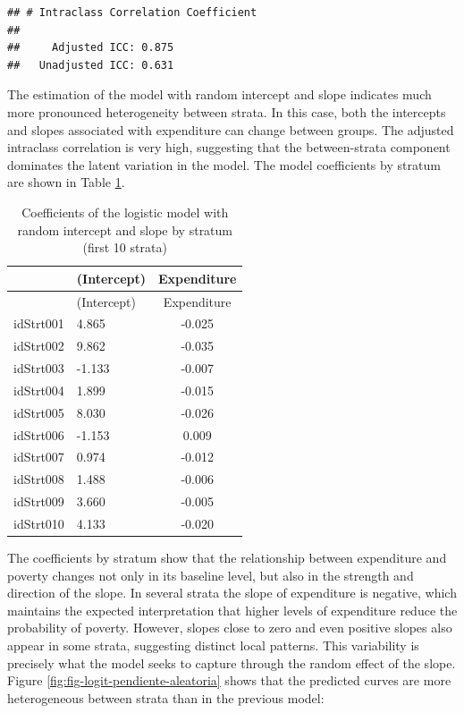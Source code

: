 \documentclass[
  english,
  12pt,
]{book}
\newenvironment{Shaded}{\begin{snugshade}}{\end{snugshade}}
\newcommand{\DataTypeTok}[1]{\textcolor[rgb]{0.13,0.29,0.53}{#1}}
\newcommand{\DecValTok}[1]{\textcolor[rgb]{0.00,0.00,0.81}{#1}}
\newcommand{\FunctionTok}[1]{\textcolor[rgb]{0.13,0.29,0.53}{\textbf{#1}}}
\newcommand{\NormalTok}[1]{#1}
\newcommand{\SpecialCharTok}[1]{\textcolor[rgb]{0.81,0.36,0.00}{\textbf{#1}}}
\begin{document}
\begin{verbatim}
## # Intraclass Correlation Coefficient
## 
##     Adjusted ICC: 0.875
##   Unadjusted ICC: 0.631
\end{verbatim}

The estimation of the model with random intercept and slope indicates much more pronounced heterogeneity between strata. In this case, both the intercepts and slopes associated with expenditure can change between groups. The adjusted intraclass correlation is very high, suggesting that the between-strata component dominates the latent variation in the model. The model coefficients by stratum are shown in Table \ref{tab:tab-coef-logit-pendiente}.

\begin{Shaded}
\end{Shaded}

\begin{longtable}[]{@{}llc@{}}
\caption{\label{tab:tab-coef-logit-pendiente}Coefficients of the logistic model with random intercept and slope by stratum (first 10 strata)}\tabularnewline
\toprule\noalign{}
& (Intercept) & Expenditure \\
\midrule\noalign{}
\endfirsthead
\toprule\noalign{}
& (Intercept) & Expenditure \\
\midrule\noalign{}
\endhead
\bottomrule\noalign{}
\endlastfoot
idStrt001 & 4.865 & -0.025 \\
idStrt002 & 9.862 & -0.035 \\
idStrt003 & -1.133 & -0.007 \\
idStrt004 & 1.899 & -0.015 \\
idStrt005 & 8.030 & -0.026 \\
idStrt006 & -1.153 & 0.009 \\
idStrt007 & 0.974 & -0.012 \\
idStrt008 & 1.488 & -0.006 \\
idStrt009 & 3.660 & -0.005 \\
idStrt010 & 4.133 & -0.020 \\
\end{longtable}

The coefficients by stratum show that the relationship between expenditure and poverty changes not only in its baseline level, but also in the strength and direction of the slope. In several strata the slope of expenditure is negative, which maintains the expected interpretation that higher levels of expenditure reduce the probability of poverty. However, slopes close to zero and even positive slopes also appear in some strata, suggesting distinct local patterns. This variability is precisely what the model seeks to capture through the random effect of the slope. Figure \ref{fig:fig-logit-pendiente-aleatoria} shows that the predicted curves are more heterogeneous between strata than in the previous model:
\end{document}
